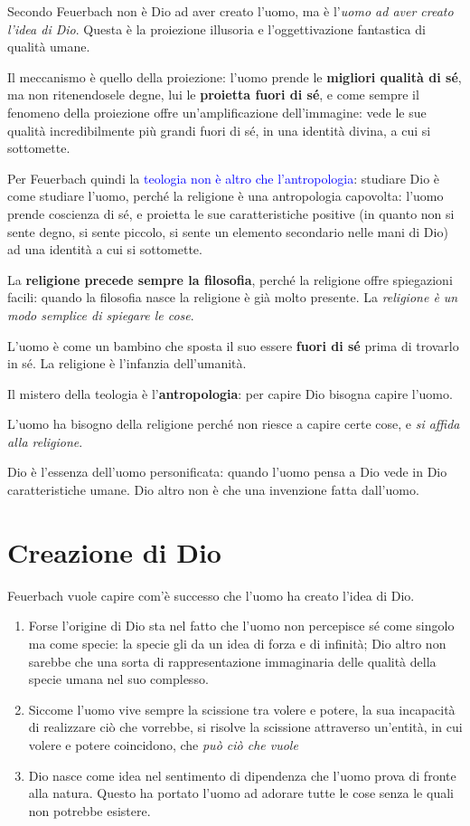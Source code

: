 \documentclass[a4paper, twoside, titlepage]{book}
\renewcommand{\emph}[1]{\textcolor{blue}{#1}}
\begin{document}
Secondo Feuerbach non è Dio ad aver creato l'uomo, ma è l'\textit{uomo ad aver creato l'idea di Dio}.
Questa è la proiezione illusoria e l'oggettivazione fantastica di qualità umane.

Il meccanismo è quello della proiezione: l'uomo prende le \textbf{migliori qualità di sé}, ma non ritenendosele degne, lui le \textbf{proietta fuori di sé}, e come sempre il fenomeno della proiezione offre un'amplificazione dell'immagine: vede le sue qualità incredibilmente più grandi fuori di sé, in una identità divina, a cui si sottomette.

Per Feuerbach quindi la \emph{teologia non è altro che l'antropologia}: studiare Dio è come studiare l'uomo, perché la religione è una antropologia capovolta: l'uomo prende coscienza di sé, e proietta le sue caratteristiche positive (in quanto non si sente degno, si sente piccolo, si sente un elemento secondario nelle mani di Dio) ad una identità a cui si sottomette.

La \textbf{religione precede sempre la filosofia}, perché la religione offre spiegazioni facili: quando la filosofia nasce la religione è già molto presente.
La \textit{religione è un modo semplice di spiegare le cose}.

L’uomo è come un bambino che sposta il suo essere \textbf{fuori di sé} prima di trovarlo in sé.​
La religione è l’infanzia dell’umanità.​

Il mistero della teologia è l'\textbf{antropologia}: per capire Dio bisogna capire l'uomo.

L'uomo ha bisogno della religione perché non riesce a capire certe cose, e \textit{si affida alla religione}.

Dio è l’essenza dell’uomo personificata​: quando l'uomo pensa a Dio vede in Dio caratteristiche umane.
Dio altro non è che una invenzione fatta dall'uomo.

\section{Creazione di Dio}

Feuerbach vuole capire com'è successo che l'uomo ha creato l'idea di Dio.

\begin{enumerate}
\item Forse l'origine di Dio sta nel fatto che l'uomo non percepisce sé come singolo ma come specie: la specie gli da un idea di forza e di infinità; Dio altro non sarebbe che una sorta di rappresentazione immaginaria delle qualità della specie umana nel suo complesso.
\item Siccome l'uomo vive sempre la scissione tra volere e potere, la sua incapacità di realizzare ciò che vorrebbe, si risolve la scissione attraverso un'entità, in cui volere e potere coincidono, che \textit{può ciò che vuole}
\item Dio nasce come idea nel sentimento di dipendenza che l’uomo prova di fronte alla natura.​ Questo ha portato l’uomo ad adorare tutte le cose senza le quali non potrebbe esistere.​
\end{enumerate}
\end{document}
